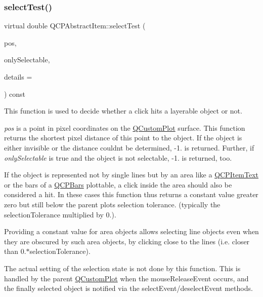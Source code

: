 \subsubsection{\texorpdfstring{select\+Test()}{selectTest()}}
{\footnotesize\ttfamily virtual double Q\+C\+P\+Abstract\+Item\+::select\+Test (\begin{DoxyParamCaption}\item[{const Q\+PointF \&}]{pos,  }\item[{bool}]{only\+Selectable,  }\item[{Q\+Variant $\ast$}]{details = {} }\end{DoxyParamCaption}) const\hspace{0.3cm}{\ttfamily [pure virtual]}}

This function is used to decide whether a click hits a layerable object or not.

{\itshape pos} is a point in pixel coordinates on the \mbox{\hyperlink{class_q_custom_plot}{Q\+Custom\+Plot}} surface. This function returns the shortest pixel distance of this point to the object. If the object is either invisible or the distance couldn\textquotesingle{}t be determined, -\/1. is returned. Further, if {\itshape only\+Selectable} is true and the object is not selectable, -\/1. is returned, too.

If the object is represented not by single lines but by an area like a \mbox{\hyperlink{class_q_c_p_item_text}{Q\+C\+P\+Item\+Text}} or the bars of a \mbox{\hyperlink{class_q_c_p_bars}{Q\+C\+P\+Bars}} plottable, a click inside the area should also be considered a hit. In these cases this function thus returns a constant value greater zero but still below the parent plot\textquotesingle{}s selection tolerance. (typically the selection\+Tolerance multiplied by 0.).

Providing a constant value for area objects allows selecting line objects even when they are obscured by such area objects, by clicking close to the lines (i.\+e. closer than 0.$\ast$selection\+Tolerance).

The actual setting of the selection state is not done by this function. This is handled by the parent \mbox{\hyperlink{class_q_custom_plot}{Q\+Custom\+Plot}} when the mouse\+Release\+Event occurs, and the finally selected object is notified via the select\+Event/deselect\+Event methods.

